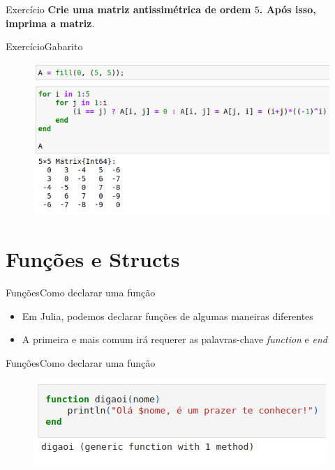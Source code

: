 \documentclass{beamer}
\begin{document}
\begin{frame}{Exercício}
    \textbf{Crie uma matriz antissimétrica de ordem $5$. Após isso, imprima a matriz}.
\end{frame}

\begin{frame}{Exercício}{Gabarito}
    \begin{figure}
        \centering
        \includegraphics[scale=0.4]{imagens/gabarito-ex01.png}
        \label{fig:my_label}
    \end{figure}    
\end{frame}


\section{Funções e Structs}
\begin{frame}{Funções}{Como declarar uma função}
    \begin{itemize}
        \item Em Julia, podemos declarar funções de algumas maneiras diferentes
        \item A primeira e mais comum irá requerer as palavras-chave \textit{function} e \textit{end}
    \end{itemize}
\end{frame}

\begin{frame}{Funções}{Como declarar uma função}
    \begin{figure}
        \centering
        \includegraphics[scale=0.4]{imagens/func01.png}
        \label{fig:my_label}
    \end{figure}   
\end{frame}
\end{document}
